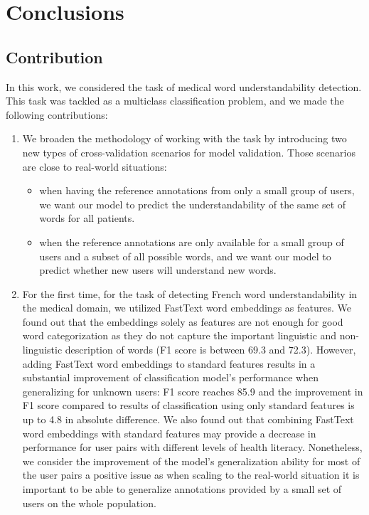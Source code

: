 \chapter{Conclusions}
\label{ch:conclusions}

\section{Contribution}
In this work, we considered the task of medical word understandability detection. This task was tackled as a multiclass classification problem, and we made the following contributions:

\begin{enumerate}[listparindent=1.5em]
    \item We broaden the methodology of working with the task by introducing two new types of cross-validation scenarios for model validation. Those scenarios are close to real-world situations:
    \begin{itemize}
        \item when having the reference annotations from only a small group of users, we want our model to predict the understandability of the same set of words for all patients.
        
        \item when the reference annotations are only available for a small group of users and a subset of all possible words, and we want our model to predict whether new users will understand new words.
    \end{itemize}
    
    \item For the first time, for the task of detecting French word understandability in the medical domain, we utilized FastText word embeddings as features. We found out that the embeddings solely as features are not enough for good word categorization as they do not capture the important linguistic and non-linguistic description of words (F1 score is between 69.3 and 72.3). However, adding FastText word embeddings to standard features results in a substantial improvement of classification model's performance when generalizing for unknown users: F1 score reaches 85.9 and the improvement in F1 score compared to results of classification using only standard features is up to 4.8 in absolute difference. We also found out that combining FastText word embeddings with standard features may provide a decrease in performance for user pairs with different levels of health literacy. Nonetheless, we consider the improvement of the model's generalization ability for most of the user pairs a positive issue as when scaling to the real-world situation it is important to be able to generalize annotations provided by a small set of users on the whole population.
    

\end{enumerate}
